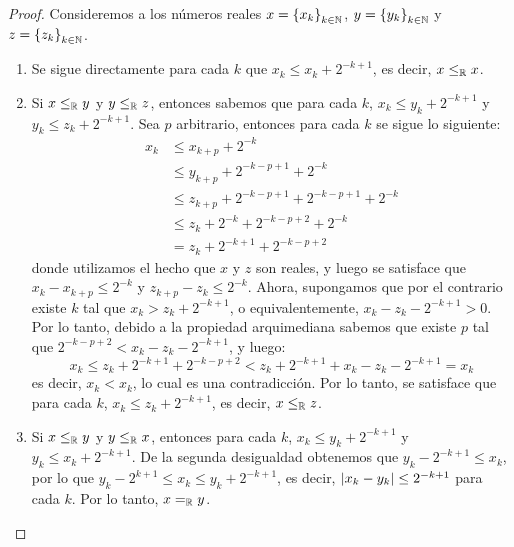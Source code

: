 \begin{proof}
	Consideremos a los números reales $x =\set*{x_{k}}_{k\in\NN}$, $y =\set*{y_{k}}_{k\in\NN}$ y $z =\set*{z_{k}}_{k\in\NN}$.

	\begin{enumerate}
		\item Se sigue directamente para cada $k$ que $x_{k}\leq x_{k} + 2^{-k + 1}$, es decir, $x\leq_{\RR} x$.
		
		\item Si $x\leq_{\RR} y$ y $y\leq_{\RR} z$, entonces sabemos que para cada $k$, $x_{k}\leq y_{k} + 2^{-k + 1}$ y $y_{k}\leq z_{k} + 2^{-k + 1}$. Sea $p$ arbitrario, entonces para cada $k$ se sigue lo siguiente:
		\begin{align*}
			x_{k} &\leq x_{k + p} + 2^{-k}\\
			&\leq y_{k + p} + 2^{-k - p + 1} + 2^{-k}\\
			&\leq z_{k + p} + 2^{-k - p + 1} + 2^{-k - p + 1} + 2^{-k}\\
			&\leq z_{k} + 2^{-k} + 2^{-k - p + 2} + 2^{-k}\\
			&= z_{k} + 2^{-k + 1} + 2^{-k - p + 2}
		\end{align*}
		donde utilizamos el hecho que $x$ y $z$ son reales, y luego se satisface que $x_{k} - x_{k + p}\leq 2^{-k}$ y $z_{k + p} - z_{k}\leq 2^{-k}$. Ahora, supongamos que por el contrario existe $k$ tal que $x_{k} > z_{k} + 2^{-k + 1}$, o equivalentemente, $x_{k} - z_{k} - 2^{-k + 1} > 0$. Por lo tanto, debido a la propiedad arquimediana sabemos que existe $p$ tal que $2^{-k - p + 2} < x_{k} - z_{k} - 2^{-k + 1}$, y luego:
		\[
			x_{k}\leq z_{k} + 2^{-k + 1} + 2^{-k - p + 2} < z_{k} + 2^{-k + 1} + x_{k} - z_{k} - 2^{-k + 1} = x_{k}
		\] 
		es decir, $x_{k} < x_{k}$, lo cual es una contradicción. Por lo tanto, se satisface que para cada $k$, $x_{k}\leq z_{k} + 2^{-k + 1}$, es decir, $x\leq_{\RR} z$.

		\item Si $x\leq_{\RR} y$ y $y\leq_{\RR} x$, entonces para cada $k$, $x_{k}\leq y_{k} + 2^{-k + 1}$ y $y_{k}\leq x_{k} + 2^{-k + 1}$. De la segunda desigualdad obtenemos que $y_{k} - 2^{-k + 1}\leq x_{k}$, por lo que $y_{k} - 2^{k + 1}\leq x_{k}\leq y_{k} + 2^{-k + 1}$, es decir, $\abs*{x_{k} - y_{k}}\leq 2^{-k + 1}$ para cada $k$. Por lo tanto, $x =_{\RR} y$.
	\end{enumerate}
\end{proof}
